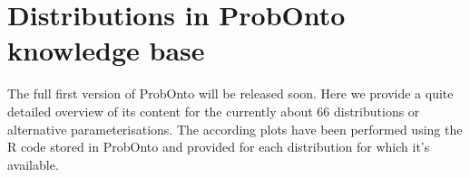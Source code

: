 

\chapter{Distributions in ProbOnto knowledge base}
\label{ch:probontoAppendix}

The full first version of ProbOnto will be released soon. Here we provide 
a quite detailed overview of its content for the currently about 66 distributions
or alternative parameterisations. The according plots have been performed using 
the R code stored in ProbOnto and provided for each distribution for which it's available.


